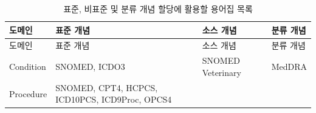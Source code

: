\documentclass[11pt]{book}
\theoremstyle{definition}
\theoremstyle{definition}
\theoremstyle{definition}
\theoremstyle{remark}
\begin{document}
\begin{longtable}[]{@{}llll@{}}
\caption{\label{tab:vocabList} 표준, 비표준 및 분류 개념 할당에 활용할
용어집 목록}\tabularnewline
\toprule
\begin{minipage}[b]{0.12\columnwidth}\raggedright\strut
도메인\strut
\end{minipage} & \begin{minipage}[b]{0.21\columnwidth}\raggedright\strut
표준 개념\strut
\end{minipage} & \begin{minipage}[b]{0.21\columnwidth}\raggedright\strut
소스 개념\strut
\end{minipage} & \begin{minipage}[b]{0.18\columnwidth}\raggedright\strut
분류 개념\strut
\end{minipage}\tabularnewline
\midrule
\endfirsthead
\toprule
\begin{minipage}[b]{0.12\columnwidth}\raggedright\strut
도메인\strut
\end{minipage} & \begin{minipage}[b]{0.21\columnwidth}\raggedright\strut
표준 개념\strut
\end{minipage} & \begin{minipage}[b]{0.21\columnwidth}\raggedright\strut
소스 개념\strut
\end{minipage} & \begin{minipage}[b]{0.18\columnwidth}\raggedright\strut
분류 개념\strut
\end{minipage}\tabularnewline
\midrule
\endhead
\begin{minipage}[t]{0.12\columnwidth}\raggedright\strut
Condition\strut
\end{minipage} & \begin{minipage}[t]{0.21\columnwidth}\raggedright\strut
SNOMED, ICDO3\strut
\end{minipage} & \begin{minipage}[t]{0.21\columnwidth}\raggedright\strut
SNOMED Veterinary\strut
\end{minipage} & \begin{minipage}[t]{0.18\columnwidth}\raggedright\strut
MedDRA\strut
\end{minipage}\tabularnewline
\begin{minipage}[t]{0.12\columnwidth}\raggedright\strut
Procedure\strut
\end{minipage} & \begin{minipage}[t]{0.21\columnwidth}\raggedright\strut
SNOMED, CPT4, HCPCS, ICD10PCS, ICD9Proc, OPCS4\strut

\end{minipage}
\end{longtable}
\end{document}
